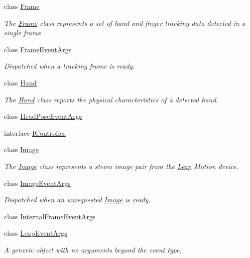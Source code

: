 \begin{DoxyCompactItemize}
class \mbox{\hyperlink{class_leap_1_1_frame}{Frame}}
\begin{DoxyCompactList}\small\item\em The \mbox{\hyperlink{class_leap_1_1_frame}{Frame}} class represents a set of hand and finger tracking data detected in a single frame. \end{DoxyCompactList}\item 
class \mbox{\hyperlink{class_leap_1_1_frame_event_args}{Frame\+Event\+Args}}
\begin{DoxyCompactList}\small\item\em Dispatched when a tracking frame is ready. \end{DoxyCompactList}\item 
class \mbox{\hyperlink{class_leap_1_1_hand}{Hand}}
\begin{DoxyCompactList}\small\item\em The \mbox{\hyperlink{class_leap_1_1_hand}{Hand}} class reports the physical characteristics of a detected hand. \end{DoxyCompactList}\item 
class \mbox{\hyperlink{class_leap_1_1_head_pose_event_args}{Head\+Pose\+Event\+Args}}
\item 
interface \mbox{\hyperlink{interface_leap_1_1_i_controller}{I\+Controller}}
\item 
class \mbox{\hyperlink{class_leap_1_1_image}{Image}}
\begin{DoxyCompactList}\small\item\em The \mbox{\hyperlink{class_leap_1_1_image}{Image}} class represents a stereo image pair from the \mbox{\hyperlink{namespace_leap}{Leap}} Motion device. \end{DoxyCompactList}\item 
class \mbox{\hyperlink{class_leap_1_1_image_event_args}{Image\+Event\+Args}}
\begin{DoxyCompactList}\small\item\em Dispatched when an unrequested \mbox{\hyperlink{class_leap_1_1_image}{Image}} is ready. \end{DoxyCompactList}\item 
class \mbox{\hyperlink{class_leap_1_1_internal_frame_event_args}{Internal\+Frame\+Event\+Args}}
\item 
class \mbox{\hyperlink{class_leap_1_1_leap_event_args}{Leap\+Event\+Args}}
\begin{DoxyCompactList}\small\item\em A generic object with no arguments beyond the event type. \end{DoxyCompactList}\item 

\end{DoxyCompactItemize}
